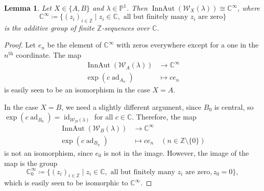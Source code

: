 \documentclass[11pt, svgnames]{amsart}
\DeclareMathOperator{\ad}{ad}
\newcommand{\ZZ}{\mathbb{Z}}
\newcommand{\CC}{\mathbb{C}}
\newcommand{\PP}{\mathbb{P}}
\newcommand{\W}{\mathcal{W}}
\DeclareMathOperator{\id}{id}
\DeclareMathOperator{\InnAut}{InnAut}
\newcommand{\nonzero}{\setminus \{0\}}
\newtheorem{lemma}[proposition]{Lemma}
\theoremstyle{definition}
\begin{document}
\begin{lemma}\label{lem:group structure of inner auomorphisms}
    Let $X \in \{A,B\}$ and $\lambda \in \PP^1$. Then $\InnAut(\W_X(\lambda)) \cong \CC^{\infty}$, where
    \begin{equation}\label{eq:Cinfty}
        \CC^\infty \coloneqq \{(z_i)_{i \in \ZZ} \mid z_i \in \CC, \text{ all but finitely many } z_i \text{ are zero}\}
    \end{equation}
    is the additive group of finite $\ZZ$-sequences over $\CC$.
\end{lemma}
\begin{proof}
    Let $e_n$ be the element of $\CC^\infty$ with zeros everywhere except for a one in the $n^\text{th}$ coordinate. The map
    \begin{align*}
        \InnAut(\W_A(\lambda)) &\to \CC^\infty \\
        \exp(c \ad_{A_n}) &\mapsto c e_n
    \end{align*}
    is easily seen to be an isomorphism in the case $X = A$.
    
    In the case $X = B$, we need a slightly different argument, since $B_0$ is central, so $\exp(c \ad_{B_0}) = \id_{\W_B(\lambda)}$ for all $c \in \CC$. Therefore, the map
    \begin{align*}
        \InnAut(\W_B(\lambda)) &\to \CC^\infty \\
        \exp(c \ad_{B_n}) &\mapsto c e_n \quad (n \in \ZZ \nonzero)
    \end{align*}
    is not an isomorphism, since $e_0$ is not in the image. However, the image of the map is the group
    \begin{equation}\label{eq:C0infty}
        \CC_0^\infty \coloneqq \{(z_i)_{i \in \ZZ} \mid z_i \in \CC, \text{ all but finitely many } z_i \text{ are zero}, z_0 = 0\},
    \end{equation}
    which is easily seen to be isomorphic to $\CC^\infty$.
\end{proof}
\end{document}
